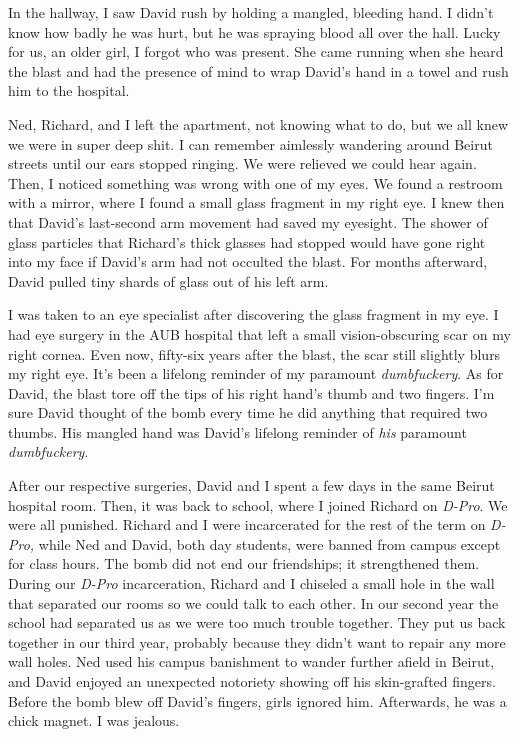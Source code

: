 In the hallway, I saw David rush by holding a mangled, bleeding hand. I
didn't know how badly he was hurt, but he was spraying blood all over
the hall. Lucky for us, an older girl, I forgot who was present. She
came running when she heard the blast and had the presence of mind to
wrap David's hand in a towel and rush him to the hospital.

Ned, Richard, and I left the apartment, not knowing what to do, but we
all knew we were in super deep shit. I can remember aimlessly wandering
around Beirut streets until our ears stopped ringing. We were relieved
we could hear again. Then, I noticed something was wrong with one of my
eyes. We found a restroom with a mirror, where I found a small glass
fragment in my right eye. I knew then that David's last-second arm
movement had saved my eyesight. The shower of glass particles that
Richard's thick glasses had stopped would have gone right into my face
if David's arm had not occulted the blast. For months afterward, David
pulled tiny shards of glass out of his left arm.

I was taken to an eye specialist after discovering the glass fragment in
my eye. I had eye surgery in the AUB hospital that left a small
vision-obscuring scar on my right cornea. Even now, fifty-six years
after the blast, the scar still slightly blurs my right eye. It's been a
lifelong reminder of my paramount \emph{dumbfuckery}. As for David, the
blast tore off the tips of his right hand's thumb and two fingers. I'm
sure David thought of the bomb every time he did anything that required
two thumbs. His mangled hand was David's lifelong reminder of \emph{his}
paramount \emph{dumbfuckery}.

After our respective surgeries, David and I spent a few days in the same
Beirut hospital room. Then, it was back to school, where I joined
Richard on \emph{D-Pro}. We were all punished. Richard and I were
incarcerated for the rest of the term on \emph{D-Pro,} while Ned and
David, both day students, were banned from campus except for class
hours. The bomb did not end our friendships; it strengthened them.
During our \emph{D-Pro} incarceration, Richard and I chiseled a small
hole in the wall that separated our rooms so we could talk to each
other. In our second year the school had separated us as we were too
much trouble together. They put us back together in our third year,
probably because they didn't want to repair any more wall holes. Ned
used his campus banishment to wander further afield in Beirut, and David
enjoyed an unexpected notoriety showing off his skin-grafted fingers.
Before the bomb blew off David's fingers, girls ignored him. Afterwards,
he was a chick magnet. I was jealous.


